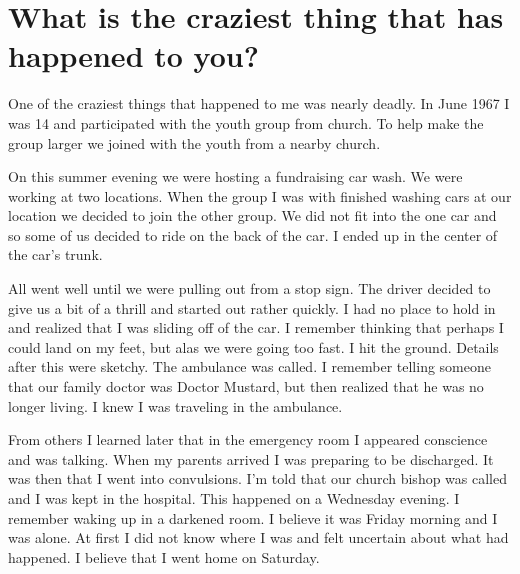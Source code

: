 \section{What is the craziest thing that has happened to you?}
One of the craziest things that happened to me was nearly deadly.
In June 1967 I was 14 and participated with the youth group from church.
To help make the group larger we joined with the youth from a nearby church.

On this summer evening we were hosting a fundraising car wash.
We were working at two locations.
When the group I was with finished washing cars at our location we decided to join the other group.
We did not fit into the one car and so some of us decided to ride on the back of the car.
I ended up in the center of the car's trunk.

All went well until we were pulling out from a stop sign.
The driver decided to give us a bit of a thrill and started out rather quickly.
I had no place to hold in and realized that I was sliding off of the car.
I remember thinking that perhaps I could land on my feet, but alas we were going too fast.
I hit the ground.
Details after this were sketchy.
The ambulance was called.
I remember telling someone that our family doctor was Doctor Mustard, but then realized that he was no longer living.
I knew I was traveling in the ambulance.

From others I learned later that in the emergency room I appeared conscience and was talking.
When my parents arrived I was preparing to be discharged.
It was then that I went into convulsions.
I'm told that our church bishop was called and I was kept in the hospital.
This happened on a Wednesday evening.
I remember waking up in a darkened room.
I believe it was Friday morning and I was alone.
At first I did not know where I was and felt uncertain about what had happened.
I believe that I went home on Saturday.






